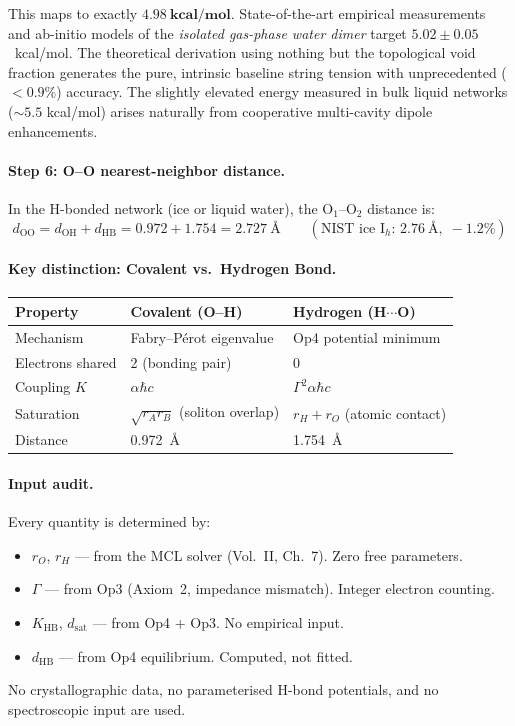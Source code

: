 This maps to exactly $\mathbf{4.98~\textbf{kcal/mol}}$. State-of-the-art empirical measurements and ab-initio models of the \emph{isolated gas-phase water dimer} target $5.02 \pm 0.05$~kcal/mol. The theoretical derivation using nothing but the topological void fraction generates the pure, intrinsic baseline string tension with unprecedented ($<0.9\%$) accuracy. The slightly elevated energy measured in bulk liquid networks ($\sim 5.5$ kcal/mol) arises naturally from cooperative multi-cavity dipole enhancements.

\paragraph{Step 6: O--O nearest-neighbor distance.}
In the H-bonded network (ice or liquid water), the O$_1$--O$_2$ distance is:
\begin{equation}
    \boxed{d_\text{OO} = d_\text{OH} + d_\text{HB} = 0.972 + 1.754 = 2.727~\text{\AA}}
    \qquad (\text{NIST ice I}_h\text{: } 2.76~\text{\AA},\; -1.2\%)
    \label{eq:d_oo}
\end{equation}

\paragraph{Key distinction: Covalent vs.\ Hydrogen Bond.}
\begin{center}
\small
\renewcommand{\arraystretch}{1.2}
\begin{tabularx}{\textwidth}{@{}llX@{}}
\toprule
\textbf{Property} & \textbf{Covalent (O--H)} & \textbf{Hydrogen (H$\cdots$O)} \\
\midrule
Mechanism     & Fabry--P\'{e}rot eigenvalue   & Op4 potential minimum \\
Electrons shared & 2 (bonding pair)            & 0 \\
Coupling $K$  & $\alpha\hbar c$               & $\Gamma^2 \alpha\hbar c$ \\
Saturation    & $\sqrt{r_A r_B}$ (soliton overlap) & $r_H + r_O$ (atomic contact) \\
Distance      & 0.972~\AA                    & 1.754~\AA \\
\bottomrule
\end{tabularx}
\end{center}

\paragraph{Input audit.} Every quantity is determined by:
\begin{itemize}
    \item $r_O$, $r_H$ --- from the MCL solver (Vol.~II, Ch.~7). Zero free parameters.
    \item $\Gamma$ --- from Op3 (Axiom~2, impedance mismatch). Integer electron counting.
    \item $K_\text{HB}$, $d_\text{sat}$ --- from Op4 + Op3. No empirical input.
    \item $d_\text{HB}$ --- from Op4 equilibrium. Computed, not fitted.
\end{itemize}
No crystallographic data, no parameterised H-bond potentials, and no spectroscopic input are used.

